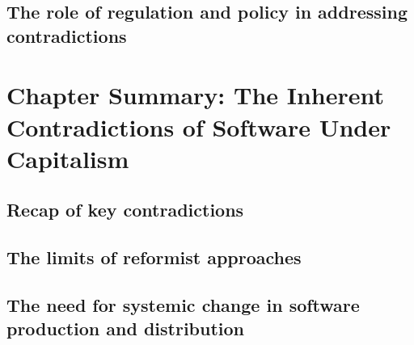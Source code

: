 \subsection{The role of regulation and policy in addressing contradictions}

\newpage
\section{Chapter Summary: The Inherent Contradictions of Software Under Capitalism}
\subsection{Recap of key contradictions}
\subsection{The limits of reformist approaches}
\subsection{The need for systemic change in software production and distribution}